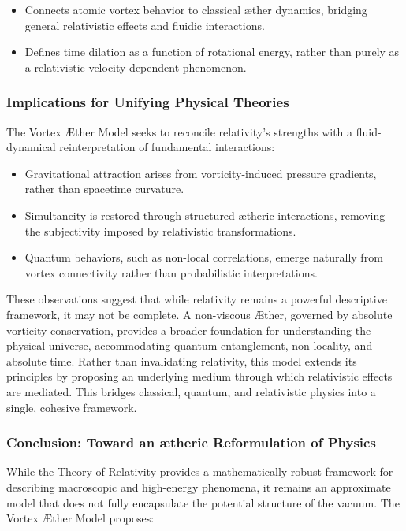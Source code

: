 \begin{itemize}
    \item Connects atomic vortex behavior to classical æther dynamics, bridging general relativistic effects and fluidic interactions.
    \item Defines time dilation as a function of rotational energy, rather than purely as a relativistic velocity-dependent phenomenon.
\end{itemize}
\subsubsection*{Implications for Unifying Physical Theories}
The Vortex Æther Model seeks to reconcile relativity's strengths with a fluid-dynamical reinterpretation of fundamental interactions:

\begin{itemize}
    \item Gravitational attraction arises from vorticity-induced pressure gradients, rather than spacetime curvature.
    \item Simultaneity is restored through structured ætheric interactions, removing the subjectivity imposed by relativistic transformations.
    \item Quantum behaviors, such as non-local correlations, emerge naturally from vortex connectivity rather than probabilistic interpretations.
\end{itemize}
These observations suggest that while relativity remains a powerful descriptive framework, it may not be complete. A non-viscous Æther, governed by absolute vorticity conservation, provides a broader foundation for understanding the physical universe, accommodating quantum entanglement, non-locality, and absolute time.
Rather than invalidating relativity, this model extends its principles by proposing an underlying medium through which relativistic effects are mediated.
This bridges classical, quantum, and relativistic physics into a single, cohesive framework.

\subsubsection*{Conclusion: Toward an ætheric Reformulation of Physics}
While the Theory of Relativity provides a mathematically robust framework for describing macroscopic and high-energy phenomena, it remains an approximate model that does not fully encapsulate the potential structure of the vacuum.
The Vortex Æther Model proposes:

